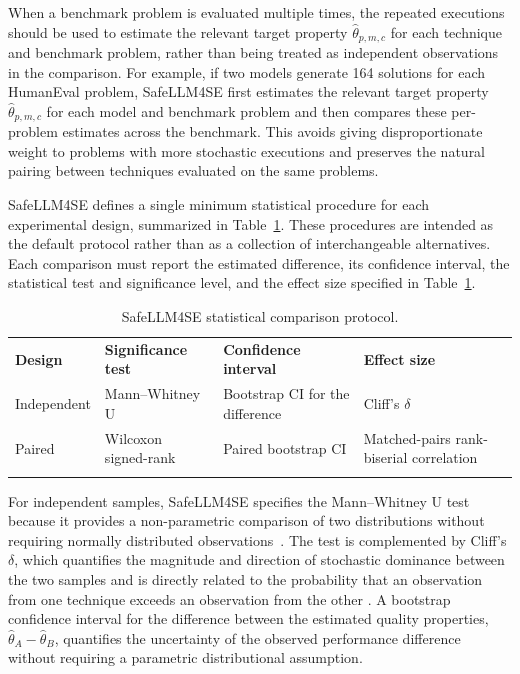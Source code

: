 \documentclass{IEEEcsmag}
\begin{document}
When a benchmark problem is evaluated multiple times, the repeated executions should be used to estimate the relevant target property $\hat{\theta}_{p,m,c}$ for each technique and benchmark problem, rather than being treated as independent observations in the comparison. For example, if two models generate 164 solutions for each HumanEval problem, SafeLLM4SE first estimates the relevant target property $\hat{\theta}_{p,m,c}$ for each model and benchmark problem and then compares these per-problem estimates across the benchmark. This avoids giving disproportionate weight to problems with more stochastic executions and preserves the natural pairing between techniques evaluated on the same problems.

SafeLLM4SE defines a single minimum statistical procedure for each experimental design, summarized in Table~\ref{table:comparison}. These
procedures are intended as the default protocol rather than as a collection of interchangeable alternatives. Each comparison must report the estimated difference, its confidence interval, the statistical test and significance level, and the effect size specified in Table~\ref{table:comparison}.

\begin{table}%
	\vspace*{4pt}
	\caption{SafeLLM4SE statistical comparison protocol.}
	\label{table:comparison}
	\begin{tabular*}{\linewidth}{@{\extracolsep\fill} p{1.8cm} p{3cm} p{4cm} p{4.8cm}}
		\toprule
		\textbf{Design} & \textbf{Significance test} & \textbf{Confidence interval} & \textbf{Effect size} \\
		\colrule
		Independent &
		Mann--Whitney U &
		Bootstrap CI for the difference &
		Cliff's $\delta$ \\
		Paired &
		Wilcoxon signed-rank &
		Paired bootstrap CI &
		Matched-pairs rank-biserial correlation \\
		\botrule
	\end{tabular*} \vspace*{8pt}
\end{table}

For independent samples, SafeLLM4SE specifies the Mann--Whitney U test because it provides a non-parametric comparison of two distributions without requiring normally distributed observations~\cite{Efron1993}. The test is complemented by Cliff's $\delta$, which quantifies the magnitude and direction of stochastic dominance between the two samples and is directly related to the probability that an observation from one technique exceeds an observation from the other \cite{Cliff1993}. A bootstrap confidence interval for the difference between the estimated quality properties, $\hat{\theta}_A-\hat{\theta}_B$, quantifies the uncertainty of the observed performance difference without requiring a parametric distributional assumption.
\end{document}
